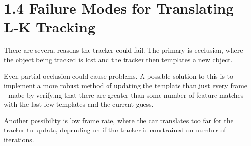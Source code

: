 


\section*{1.4 Failure Modes for Translating L-K Tracking}
There are several reasons the tracker could fail. The primary is occlusion, where the object being tracked is lost and the tracker then templates a new object. 

Even partial occlusion could cause problems. A possible solution to this is to implement a more robust method of updating the template than just every frame - mabe by verifying that there are greater than some number of feature matches with the last few templates and the current guess. 

Another possibility is low frame rate, where the car translates too far for the tracker to update, depending on if the tracker is constrained on number of iterations. 


